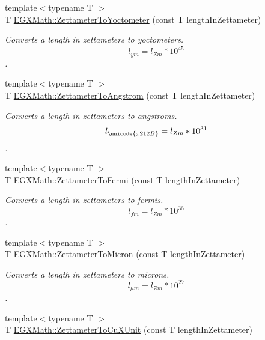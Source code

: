 \begin{DoxyCompactItemize}
{\footnotesize template$<$typename T $>$ }\\T \mbox{\hyperlink{group___e_g_x_math-_conversions-_length_conversions-_s_i-_zettameter-_s_i_ga027661828604c5467325eb50e084d96d}{E\+G\+X\+Math\+::\+Zettameter\+To\+Yoctometer}} (const T length\+In\+Zettameter)
\begin{DoxyCompactList}\small\item\em Converts a length in zettameters to yoctometers. \[ l_{ym}=l_{Zm} * 10^{45} \]. \end{DoxyCompactList}\item 
{\footnotesize template$<$typename T $>$ }\\T \mbox{\hyperlink{group___e_g_x_math-_conversions-_length_conversions-_s_i-_zettameter-_non-_s_i_ga49d813ff9592fc1fc9a184436d0849fc}{E\+G\+X\+Math\+::\+Zettameter\+To\+Angstrom}} (const T length\+In\+Zettameter)
\begin{DoxyCompactList}\small\item\em Converts a length in zettameters to angstroms. \[ l_{\unicode{x212B}}=l_{Zm} * 10^{31} \]. \end{DoxyCompactList}\item 
{\footnotesize template$<$typename T $>$ }\\T \mbox{\hyperlink{group___e_g_x_math-_conversions-_length_conversions-_s_i-_zettameter-_non-_s_i_ga791b0a401fe813fe4e6a34490f12a817}{E\+G\+X\+Math\+::\+Zettameter\+To\+Fermi}} (const T length\+In\+Zettameter)
\begin{DoxyCompactList}\small\item\em Converts a length in zettameters to fermis. \[ l_{fm}=l_{Zm} * 10^{36} \]. \end{DoxyCompactList}\item 
{\footnotesize template$<$typename T $>$ }\\T \mbox{\hyperlink{group___e_g_x_math-_conversions-_length_conversions-_s_i-_zettameter-_non-_s_i_gafede369c63111d97f92238e626cdfa87}{E\+G\+X\+Math\+::\+Zettameter\+To\+Micron}} (const T length\+In\+Zettameter)
\begin{DoxyCompactList}\small\item\em Converts a length in zettameters to microns. \[ l_{\mu m}=l_{Zm} * 10^{27} \]. \end{DoxyCompactList}\item 
{\footnotesize template$<$typename T $>$ }\\T \mbox{\hyperlink{group___e_g_x_math-_conversions-_length_conversions-_s_i-_zettameter-_non-_s_i_ga91f2890d91086a45ad9d2b5e7e82b60a}{E\+G\+X\+Math\+::\+Zettameter\+To\+Cu\+X\+Unit}} (const T length\+In\+Zettameter)

\end{DoxyCompactItemize}
